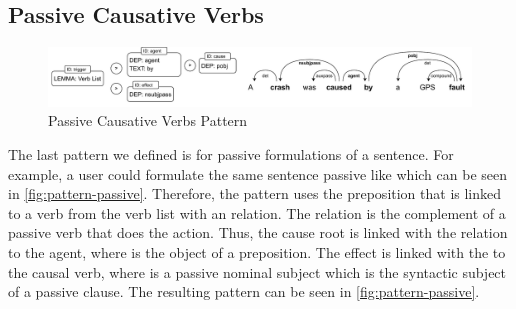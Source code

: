 \subsection{Passive Causative Verbs}\label{subsec:passive-causative-verbs-pattern}
\begin{figure}
    \includegraphics[width=\textwidth]{figures/cause_effect_extraction/passive_pattern}
    \caption{Passive Causative Verbs Pattern}\label{fig:pattern-passive}
\end{figure}
The last pattern we defined is for passive formulations of a sentence.
For example, a user could formulate the same sentence passive like  which can be seen in \autoref{fig:pattern-passive}.
Therefore, the pattern uses the preposition  that is linked to a verb from the verb list with an  relation.
The  relation is the complement of a passive verb that does the action.
Thus, the cause root is linked with the  relation to the  agent, where  is the object of a preposition.
The effect is linked with the  to the causal verb, where  is a passive nominal subject which is the syntactic subject of a passive clause.
The resulting pattern can be seen in \autoref{fig:pattern-passive}.

